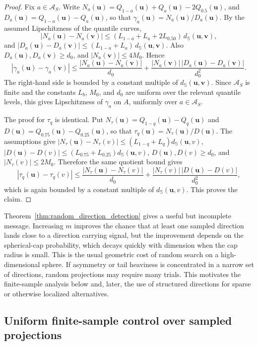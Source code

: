 \documentclass[11pt]{article}
\theoremstyle{plain}
\theoremstyle{definition}
\theoremstyle{remark}
\def\u{\bm{u}}
\def\v{\bm{v}}
\newcommand{\abs}[1]{\left\lvert #1 \right\rvert}
\begin{document}
\begin{proof}
	Fix \(a\in\mathcal A_S\). Write \(N_a(\u)=Q_{1-a}(\u)+Q_a(\u)-2Q_{0.5}(\u)\), and \(D_a(\u)=Q_{1-a}(\u)-Q_a(\u)\), so that \(\gamma_{a}(\u)=N_a(\u)/D_a(\u)\). By the assumed Lipschitzness of the quantile curves,
	\[
	\abs{N_a(\u)-N_a(\v)} \leqslant \left(L_{1-a}+L_a+2L_{0.50}\right)\,d_{\mathbb S}(\u,\v),
	\]
	and \(\abs{D_a(\u)-D_a(\v)} \leqslant (L_{1-a}+L_a)\,d_{\mathbb S}(\u,\v)\). Also
	\(D_a(\u),D_a(\v)\geqslant d_0\), and \(|N_a(\v)|\leqslant 4M_0\). Hence
	\[
	\abs{\gamma_{a}(\u)-\gamma_{a}(\v)} \leqslant \frac{|N_a(\u)-N_a(\v)|}{d_0} + \frac{|N_a(\v)|\,|D_a(\u)-D_a(\v)|}{d_0^2}.
	\]
	The right-hand side is bounded by a constant multiple of \(d_{\mathbb S}(\u,\v)\). Since \(\mathcal A_S\) is finite and the constants \(L_b\), \(M_0\), and \(d_0\) are uniform over the relevant quantile levels, this gives Lipschitzness of \(\gamma_{a}\) on \(A\), uniformly over
	\(a\in\mathcal A_S\).

	The proof for \(\tau_q\) is identical. Put \(N_\tau(\u)=Q_{1-q}(\u)-Q_q(\u)\) and \(D(\u)=Q_{0.75}(\u)-Q_{0.25}(\u)\), so that \(\tau_q(\u)=N_\tau(\u)/D(\u)\). The assumptions give \(|N_\tau(\u)-N_\tau(v)|\leqslant (L_{1-q}+L_q)d_{\mathbb S}(\u,v)\), \(|D(\u)-D(v)|\leqslant (L_{0.75}+L_{0.25})d_{\mathbb S}(\u,v)\), \(D(\u),D(v)\geqslant d_0\), and \(|N_\tau(v)|\leqslant 2M_0\). Therefore the same quotient bound gives
	\[
	\abs{\tau_q(\u)-\tau_q(v)} \leqslant \frac{|N_\tau(\u)-N_\tau(v)|}{d_0} + \frac{|N_\tau(v)|\,|D(\u)-D(v)|}{d_0^2},
	\]
	which is again bounded by a constant multiple of \(d_{\mathbb S}(\u,v)\). This proves the claim.
\end{proof}

Theorem~\ref{thm:random_direction_detection} gives a useful but incomplete message. Increasing \(m\) improves the chance that at least one sampled direction lands close to a direction carrying signal, but the improvement depends on the spherical-cap probability, which decays quickly with dimension when the cap radius is small. This is the usual geometric cost of random search on a high-dimensional sphere. If asymmetry or tail heaviness is concentrated in a narrow set of directions, random projections may require many trials. This motivates the finite-sample analysis below and, later, the use of structured directions for sparse or otherwise localized alternatives.

\subsection{Uniform finite-sample control over sampled projections}
\label{subsec:finite_sample_control}
\end{document}

